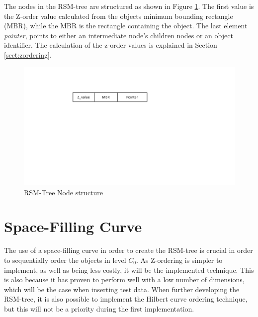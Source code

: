 \noindent
The nodes in the RSM-tree are structured as shown in Figure \ref{fig:nodeRSM}. The first value is the Z-order value calculated from the objects minimum bounding rectangle (MBR), while the MBR is the rectangle containing the object. The last element \emph{pointer}, points to either an intermediate node's children nodes or an object identifier. The calculation of the z-order values is explained in Section \ref{sect:zordering}. 

\begin{figure}[ht]
    \centering
    \includegraphics[scale=0.5]{figures/node_RSM.pdf}
    \caption{RSM-Tree Node structure}
    \label{fig:nodeRSM}
\end{figure}

\section{Space-Filling Curve}
\label{sect:ordering}
The use of a space-filling curve in order to create the RSM-tree is crucial in order to sequentially order the objects in level $C_0$. As Z-ordering is simpler to implement, as well as being less costly, it will be the implemented technique. This is also because it has proven to perform well with a low number of dimensions\cite{IrregularSpace}, which will be the case when inserting test data. When further developing the RSM-tree, it is also possible to implement the Hilbert curve ordering technique, but this will not be a priority during the first implementation. 

